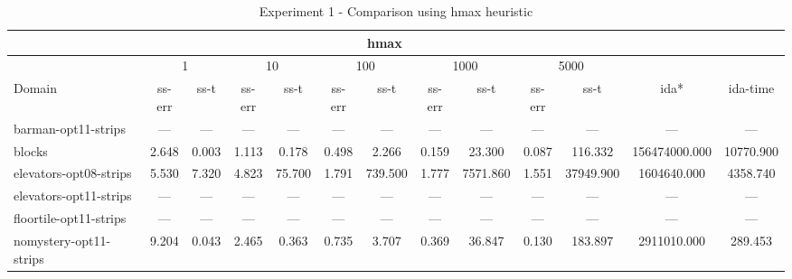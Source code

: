\documentclass[a4paper,12pt]{article}
\begin{document}
\begin{table}[]
\centering
\footnotesize\setlength{\tabcolsep}{1.8pt}
\caption{Experiment 1 - Comparison using hmax heuristic}
\label{my-label}
\begin{tabular}{l@{\hspace{6pt}} *{12}{c}}
\hline
                         & \multicolumn{10}{c}{hmax}                                                                                                          & \multicolumn{2}{l}{}     \\ \hline
                         & \multicolumn{2}{c|}{1} & \multicolumn{2}{c|}{10} & \multicolumn{2}{c|}{100} & \multicolumn{2}{c|}{1000} & \multicolumn{2}{c|}{5000} &               &           \\ \hline
Domain                   & ss-err     & ss-t      & ss-err     & ss-t       & ss-err     & ss-t        & ss-err     & ss-t         & ss-err     & ss-t         & ida*          & ida-time  \\ \hline
barman-opt11-strips      & ---        & ---       & ---        & ---        & ---        & ---         & ---        & ---          & ---        & ---          & ---           & ---       \\ \hline
blocks                   & 2.648      & 0.003     & 1.113      & 0.178      & 0.498      & 2.266       & 0.159      & 23.300       & 0.087      & 116.332      & 156474000.000 & 10770.900 \\ \hline
elevators-opt08-strips   & 5.530      & 7.320     & 4.823      & 75.700     & 1.791      & 739.500     & 1.777      & 7571.860     & 1.551      & 37949.900    & 1604640.000   & 4358.740  \\ \hline
elevators-opt11-strips   & ---        & ---       & ---        & ---        & ---        & ---         & ---        & ---          & ---        & ---          & ---           & ---       \\ \hline
floortile-opt11-strips   & ---        & ---       & ---        & ---        & ---        & ---         & ---        & ---          & ---        & ---          & ---           & ---       \\ \hline
nomystery-opt11-strips   & 9.204      & 0.043     & 2.465      & 0.363      & 0.735      & 3.707       & 0.369      & 36.847       & 0.130      & 183.897      & 2911010.000   & 289.453   \\ \hline

\end{tabular}
\end{table}
\end{document}

